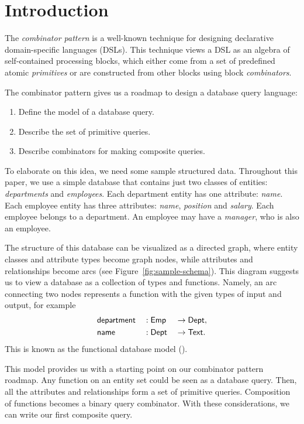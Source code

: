 
\section{Introduction}
\label{sec:introduction}

The \emph{combinator pattern} is a well-known technique for designing
declarative domain-specific languages (DSLs). This technique views a DSL as an
algebra of self-con\-tained processing blocks, which either come from a set of
predefined atomic \emph{primitives} or are constructed from other blocks using
block \emph{combinators}.

The combinator pattern gives us a roadmap to design a database query language:

\begin{enumerate}
\item
Define the model of a database query.

\item
Describe the set of primitive queries.

\item
Describe combinators for making composite queries.
\end{enumerate}

To elaborate on this idea, we need some sample structured data.  Throughout
this paper, we use a simple database that contains just two classes of
entities: \emph{departments} and \emph{employees}.  Each department entity has
one attribute: \emph{name}.  Each employee entity has three attributes:
\emph{name}, \emph{position} and \emph{salary}.  Each employee belongs to a
department.  An employee may have a \emph{manager}, who is also an employee.

The structure of this database can be visualized as a directed graph, where
entity classes and attribute types become graph nodes, while attributes and
relationships become arcs (see Figure~\ref{fig:sample-schema}).  This diagram
suggests us to view a database as a collection of types and functions.  Namely,
an arc connecting two nodes represents a function with the given types of input
and output, for example
\begin{alignat*}{3}
    & \textup{\textsf{department}} && : \textup{\textsf{Emp}} && \to \textup{\textsf{Dept}}, \\
    & \textup{\textsf{name}} && : \textup{\textsf{Dept}} && \to \textup{\textsf{Text}}.
\end{alignat*}
This is known as the functional database model (\cite{Kerschberg1976}).



This model provides us with a starting point on our combinator pattern roadmap.
Any function on an entity set could be seen as a database query.  Then, all the
attributes and relationships form a set of primitive queries.  Composition of
functions becomes a binary query combinator.  With these considerations, we can
write our first composite query.

